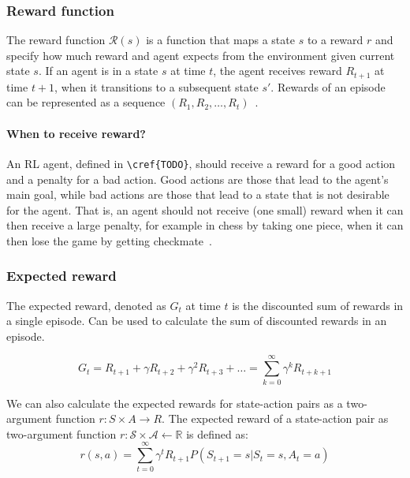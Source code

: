 \documentclass[../xlapes02]{subfiles}
\begin{document}
    \subsubsection{Reward function}\label{par:reward-function}
    The reward function $\mathcal{R}(s)$ is a function that maps a state $s$ to a reward $r$ and specify how much reward and agent expects from the environment given current state $s$. If an agent is in a state $s$ at time $t$, the agent receives reward  $R_{t+1}$  at time $t + 1$,  when it transitions to a subsequent state $s'$. Rewards of an episode can be represented as a sequence $(R_1, R_2, \ldots, R_t)$~\cite{FITMT25127}.


    \paragraph{When to receive reward?} An RL agent, defined in \verb|\cref{TODO}|, should receive a reward for a good action and a penalty for a bad action. Good actions are those that lead to the agent's main goal, while bad actions are those that lead to a state that is not desirable for the agent. That is, an agent should not receive (one small) reward when it can then receive a large penalty, for example in chess by taking one piece, when it can then lose the game by getting checkmate~\cite{sutton2018reinforcement}.

    \subsubsection{Expected reward}\label{par:expected-reward}
    The expected reward, denoted as $G_t$ at time $t$ is the discounted sum of rewards in a single episode. Can be used to calculate the sum of discounted rewards in an episode.

    \begin{equation}
        G_t = R_{t+1} + \gamma R_{t+2} + \gamma^2 R_{t+3} + \ldots = \sum_{k=0}^{\infty} \gamma^k R_{t+k+1}
    \end{equation}


    We can also calculate the expected rewards for state-action pairs as a two-argument function $r: S \times A \to R$.
    The expected reward of a state-action pair as two-argument function $r: \mathcal{S}\times \mathcal{A}\leftarrow \mathbb{R}$ is defined as:
    \begin{equation}
        r(s, a) = \sum_{t=0}^{\infty} \gamma^t R_{t+1} P(S_{t+1} = s|S_t = s, A_t = a)
    \end{equation}
\end{document}
